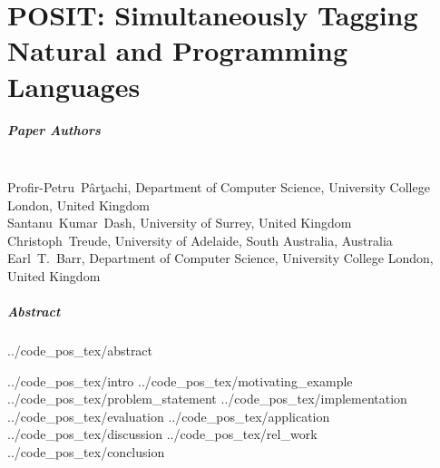 \chapter{POSIT: Simultaneously Tagging Natural and Programming Languages}
\label{chapter:posit}

\renewcommand{\ourtool}{\textsc{POSIT}\xspace}
\renewcommand{\Ourtool}{\textsc{POSIT}\xspace}
\newcommand{\stormed}{StORMeD\xspace}
\newcommand{\SO}{Stack Overflow\xspace}
\newcommand{\projurl}{\url{https://github.com/PPPI/POSIT}\xspace}

\paragraph{Paper Authors}\\
Profir-Petru~P\^ar\c{t}achi, Department of Computer Science, University College London, United Kingdom\\
Santanu~Kumar~Dash, University of Surrey, United Kingdom\\
Christoph~Treude, University of Adelaide, South Australia, Australia\\
Earl~T.~Barr, Department of Computer Science, University College London, United Kingdom

\paragraph{Abstract}
{../code_pos_tex/abstract}

{../code_pos_tex/intro}
{../code_pos_tex/motivating_example}
{../code_pos_tex/problem_statement}
{../code_pos_tex/implementation}
{../code_pos_tex/evaluation}
{../code_pos_tex/application}
{../code_pos_tex/discussion}
{../code_pos_tex/rel_work}
{../code_pos_tex/conclusion}